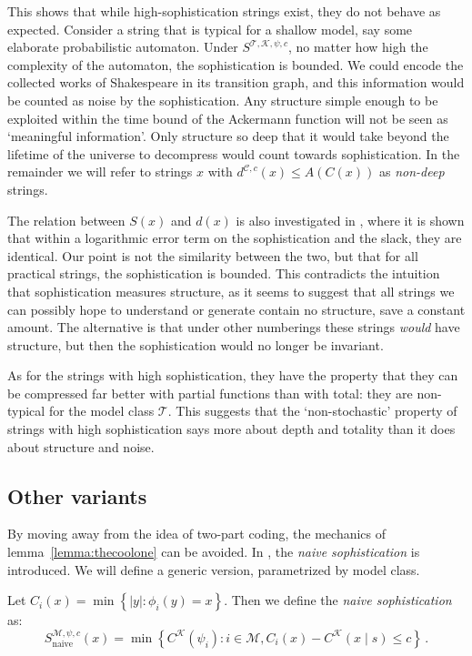 \documentclass{style/llncs}
\newcommand{\M}{\mathscr M}
\newcommand{\C}{\mathscr C}
\newcommand{\T}{\mathscr T}
\newcommand{\K}{\mathscr K}
\newcommand{\s}{S}
\newcommand{\p}{\,\text{.}}
\begin{document}
\noindent This shows that while high-sophistication strings exist, they do not behave as expected. Consider a string that is typical for a shallow model, say some elaborate probabilistic automaton. Under $\s^{\T,\K, \psi,c}$, no matter how high the complexity of the automaton, the sophistication is bounded. We could encode the collected works of Shakespeare in its transition graph, and this information would be counted as noise by the sophistication. Any structure simple enough to be exploited within the time bound of the Ackermann function will not be seen as `meaningful information'. Only structure so deep that it would take beyond the lifetime of the universe to decompress would count towards sophistication. In the remainder we will refer to strings $x$ with $d^{\C,c}(x) \leq A(C(x))$ as \emph{non-deep} strings.

The relation between $S(x)$ and $d(x)$ is also investigated in \cite{antunes2013sophistication}, where it is shown that within a logarithmic error term on the sophistication and the slack, they are identical. Our point is not the similarity between the two, but that for all practical strings, the sophistication is bounded. This contradicts the intuition that sophistication measures structure, as it seems to suggest that all strings we can possibly hope to understand or generate contain no structure, save a constant amount. The alternative is that under other numberings these strings \emph{would} have structure, but then the sophistication would no longer be invariant.

As for the strings with high sophistication, they have the property that they can be compressed far better with partial functions than with total: they are non-typical for the model class $\T$. This suggests that the `non-stochastic' property of strings with high sophistication \cite{shen1983concept,vereshchagin2004kolmogorov} says more about depth and totality than it does about structure and noise.

\subsection{Other variants}
\label{section:other}

By moving away from the idea of two-part coding, the mechanics of lemma~\ref{lemma:thecoolone} can be avoided. In \cite{mota2013sophistication}, the \emph{naive sophistication} is introduced. We will define a generic version, parametrized by model class. 

\begin{definition}
Let $C_i(x) = \min\left\{|y| : \phi_i(y) = x\right\}$. Then we define the \emph{naive sophistication} as:
\[
\s_\text{naive}^{\M, \psi, c}(x) = \min\left\{C^\K(\psi_i) : i \in \M, C_i(x) - C^\K(x\mid s) \leq c \right\} \p
\]
\end{definition} 
\end{document}
